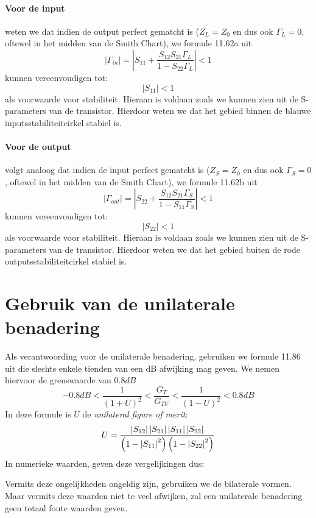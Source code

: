     \paragraph{Voor de input} weten we dat indien de output perfect gematcht is ($Z_L = Z_0$ en dus ook $\Gamma_L = 0$, oftewel in het midden van de Smith Chart), we formule 11.62a uit \cite{Pozar}
    \[
      \left| \Gamma_{in} \right| = \left| S_{11} + \frac{S_{12}S_{21}\Gamma_L}{1 - S_{22}\Gamma_L} \right| < 1
    \]
    kunnen vereenvoudigen tot:
    \[
      \left| S_{11} \right|  < 1
    \]
    als voorwaarde voor stabiliteit. Hieraan is voldaan zoals we kunnen zien uit de S-parameters van de transistor. 
    Hierdoor weten we dat het gebied binnen de blauwe inputsstabiliteitcirkel stabiel is.
    
    \paragraph{Voor de output} volgt analoog dat indien de input perfect gematcht is ($Z_S = Z_0$ en dus ook $\Gamma_S = 0$, oftewel in het midden van de Smith Chart), we formule 11.62b uit \cite{Pozar}
    \[
      \left| \Gamma_{out} \right| = \left| S_{22} + \frac{S_{12}S_{21}\Gamma_S}{1 - S_{11}\Gamma_S} \right| < 1
    \]
    kunnen vereenvoudigen tot:
    \[
      \left| S_{22} \right|  < 1
    \]
    als voorwaarde voor stabiliteit. Hieraan is voldaan zoals we kunnen zien uit de S-parameters van de transistor. 
    Hierdoor weten we dat het gebied buiten de rode outputsstabiliteitcirkel stabiel is.
    

\section{Gebruik van de unilaterale benadering}
  Als verantwoording voor de unilaterale benadering, gebruiken we formule 11.86 uit \cite{Pozar} die slechts enkele
  tienden van een dB afwijking mag geven. We nemen hiervoor de grenswaarde van $0.8 dB$
  \[
    -0.8 dB < \frac{1}{\left( 1 + U\right)^ 2} < \frac{G_T}{G_{TU}} < \frac{1}{\left( 1 - U\right)^ 2} < 0.8 dB
  \]
  In deze formule is $U$ de \textit{unilateral figure of merit}:
  \[
    U = \frac{\left| S_{12} \right| \left| S_{21} \right| \left| S_{11} \right| \left| S_{22} \right|}{ \left( 1 - \left| S_{11} \right|^2 \right) \left( 1 - \left| S_{22} \right|^2 \right)}
  \]
  In numerieke waarden, geven deze vergelijkingen dus:
    
  Vermits deze ongelijkheden ongeldig zijn, gebruiken we de bilaterale vormen. Maar vermits deze waarden niet te veel afwijken,
  zal een unilaterale benadering geen totaal foute waarden geven.
  
